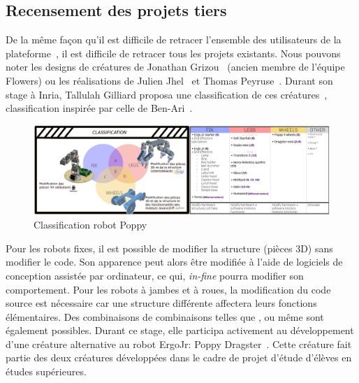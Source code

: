     \subsection{Recensement des projets tiers}
        De la même façon qu'il est difficile de retracer l'ensemble des utilisateurs de la plateforme~, il est difficile de retracer tous les projets existants. 
        Nous pouvons noter les designs de créatures de Jonathan Grizou~ (ancien membre de l'équipe Flowers) ou les réalisations de Julien Jhel~ et Thomas Peyruse~. Durant son stage à Inria, Tallulah Gilliard proposa une classification de ces créatures~, classification inspirée par celle de Ben-Ari~.
        \begin{figure}[!h]
          \centering
          \includegraphics[width=\linewidth]{Figures/Poppy-Classification_large.png}
          \caption{Classification robot Poppy~}\label{fig:Poppy-Class}
        \end{figure}\par%
        Pour les robots fixes, il est possible de modifier la structure (pièces 3D) sans modifier le code. Son apparence peut alors être modifiée à l'aide de logiciels de conception assistée par ordinateur, ce qui, \textit{in-fine} pourra modifier son comportement.
        Pour les robots à jambes et à roues, la modification du code source est nécessaire car une structure différente affectera leurs fonctions élémentaires.
        Des combinaisons de combinaisons telles que ,  ou même  sont également possibles.
        Durant ce stage, elle participa activement au développement d'une créature alternative au robot ErgoJr: Poppy Dragster~. Cette créature fait partie des deux créatures développées dans le cadre de projet d'étude d'élèves en études supérieures.
